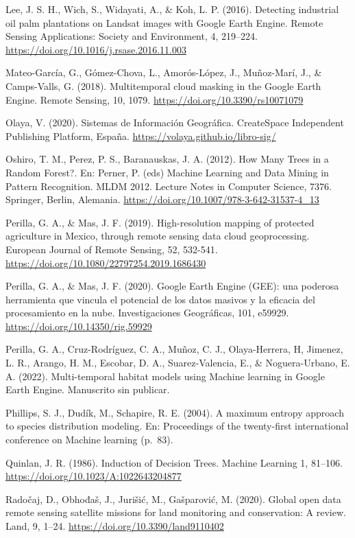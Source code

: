 \documentclass[
  12pt,
  letterpaper,
  twoside]{book}
\begin{document}
Lee, J. S. H., Wich, S., Widayati, A., \& Koh, L. P. (2016). Detecting industrial oil palm plantations on Landsat images with Google Earth Engine. Remote Sensing Applications: Society and Environment, 4, 219--224. \url{https://doi.org/10.1016/j.rsase.2016.11.003}

Mateo-García, G., Gómez-Chova, L., Amorós-López, J., Muñoz-Marí, J., \& Camps-Valls, G. (2018). Multitemporal cloud masking in the Google Earth Engine. Remote Sensing, 10, 1079. \url{https://doi.org/10.3390/rs10071079}

Olaya, V. (2020). Sistemas de Información Geográfica. CreateSpace Independent Publishing Platform, España. \url{https://volaya.github.io/libro-sig/}

Oshiro, T. M., Perez, P. S., Baranauskas, J. A. (2012). How Many Trees in a Random Forest?. En: Perner, P. (eds) Machine Learning and Data Mining in Pattern Recognition. MLDM 2012. Lecture Notes in Computer Science, 7376. Springer, Berlin, Alemania. \url{https://doi.org/10.1007/978-3-642-31537-4_13}

Perilla, G. A., \& Mas, J. F. (2019). High-resolution mapping of protected agriculture in Mexico, through remote sensing data cloud geoprocessing. European Journal of Remote Sensing, 52, 532-541. \url{https://doi.org/10.1080/22797254.2019.1686430}

Perilla, G. A., \& Mas, J. F. (2020). Google Earth Engine (GEE): una poderosa herramienta que vincula el potencial de los datos masivos y la eficacia del procesamiento en la nube. Investigaciones Geográficas, 101, e59929. \url{https://doi.org/10.14350/rig.59929}

Perilla, G. A., Cruz-Rodríguez, C. A., Muñoz, C. J., Olaya-Herrera, H, Jimenez, L. R., Arango, H. M., Escobar, D. A., Suarez-Valencia, E., \& Noguera-Urbano, E. A. (2022). Multi-temporal habitat models using Machine learning in Google Earth Engine. Manuscrito sin publicar.

Phillips, S. J., Dudík, M., Schapire, R. E. (2004). A maximum entropy approach to species distribution modeling. En: Proceedings of the twenty-first international conference on Machine learning (p.~83).

Quinlan, J. R. (1986). Induction of Decision Trees. Machine Learning 1, 81--106. \url{https://doi.org/10.1023/A:1022643204877}

Radočaj, D., Obhođaš, J., Jurišić, M., Gašparović, M. (2020). Global open data remote sensing satellite missions for land monitoring and conservation: A review. Land, 9, 1--24. \url{https://doi.org/10.3390/land9110402}
\end{document}
